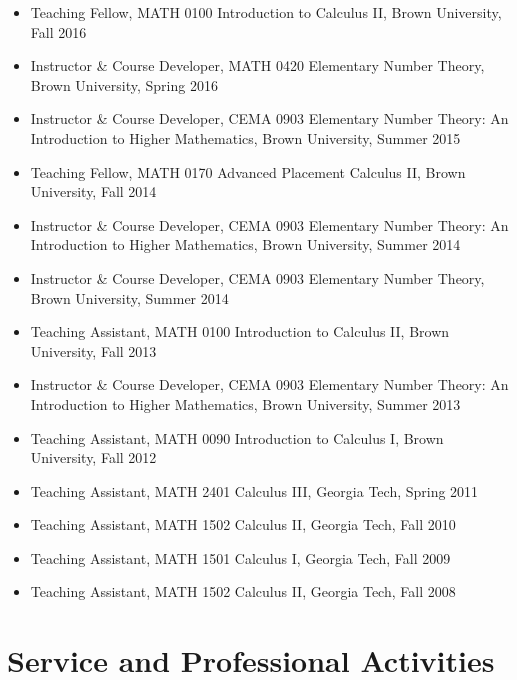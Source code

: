 \begin{itemize}

  \item Teaching Fellow,
    MATH 0100 Introduction to Calculus II, Brown University, Fall 2016
  \item Instructor \& Course Developer,
    MATH 0420 Elementary Number Theory, Brown University, Spring 2016
  \item Instructor \& Course Developer,
    CEMA 0903 Elementary Number Theory: An Introduction to Higher Mathematics,
    Brown University, Summer 2015
  \item Teaching Fellow,
    MATH 0170 Advanced Placement Calculus II, Brown University, Fall 2014
  \item Instructor \& Course Developer,
    CEMA 0903 Elementary Number Theory: An Introduction to Higher Mathematics,
    Brown University, Summer 2014
  \item Instructor \& Course Developer,
    CEMA 0903 Elementary Number Theory, Brown University, Summer 2014
  \item Teaching Assistant,
    MATH 0100 Introduction to Calculus II, Brown University, Fall 2013
  \item Instructor \& Course Developer,
    CEMA 0903 Elementary Number Theory: An Introduction to Higher Mathematics,
    Brown University, Summer 2013
  \item Teaching Assistant,
    MATH 0090 Introduction to Calculus I, Brown University, Fall 2012
  \item Teaching Assistant,
    MATH 2401 Calculus III, Georgia Tech, Spring 2011
  \item Teaching Assistant,
    MATH 1502 Calculus II, Georgia Tech, Fall 2010
  \item Teaching Assistant,
    MATH 1501 Calculus I, Georgia Tech, Fall 2009
  \item Teaching Assistant,
    MATH 1502 Calculus II, Georgia Tech, Fall 2008

\end{itemize}


\section*{Service and Professional Activities}

